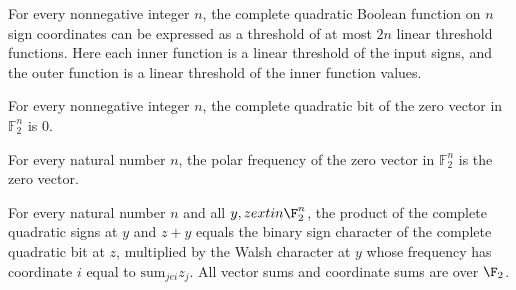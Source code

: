 \begin{theorem}
\label{FABL.completeQuadraticBoolean_hasThresholdOfThresholdsSizeAtMost_two_mul}
\leanok
{}
For every nonnegative integer $n$, the complete quadratic Boolean function on $n$ sign
coordinates can be expressed as a threshold of at most $2n$ linear threshold functions.
Here each inner function is a linear threshold of the input signs, and the outer
function is a linear threshold of the inner function values.
\end{theorem}

\begin{theorem}
\label{FABL.completeQuadraticBit_zero}
\leanok
{}
For every nonnegative integer $n$, the complete quadratic bit of the zero vector in
$\mathbb{F}_2^n$ is $0$.
\end{theorem}

\begin{theorem}
\label{FABL.completeQuadraticPolarFrequency_zero}
\leanok
{}
For every natural number $n$, the polar frequency of the zero vector in $\mathbb F_2^n$
is the zero vector.
\end{theorem}

\begin{theorem}
\label{FABL.completeQuadratic_mul_translate}
\leanok
{}
For every natural number $n$ and all $y,z	ext{in }\F_2^n$, the product of the complete
quadratic signs at $y$ and $z+y$ equals the binary sign character of the complete
quadratic bit at $z$, multiplied by the Walsh character at $y$ whose frequency has
coordinate $i$ equal to $\text{sum}_{j
e i}z_j$. All vector sums and coordinate sums are over $\F_2$.
\end{theorem}

